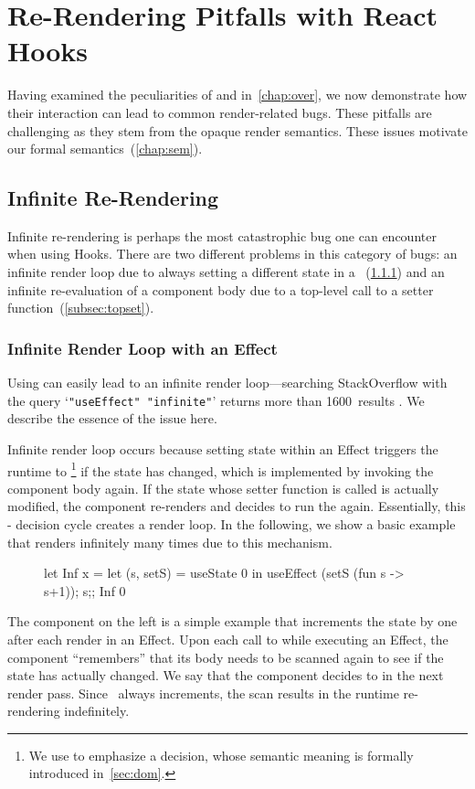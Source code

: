 \chapter{Re-Rendering Pitfalls with React Hooks}\label{chap:pit}
Having examined the peculiarities of  and  in~\cref{chap:over}, we now demonstrate how their interaction can lead to common render-related bugs.
These pitfalls are challenging as they stem from the opaque render semantics.
These issues motivate our formal semantics~(\cref{chap:sem}).


\section{Infinite Re-Rendering}\label{sec:inf}
Infinite re-rendering is perhaps the most catastrophic bug one can encounter when using Hooks.
There are two different problems in this category of bugs: an infinite render loop due to always setting a different state in a ~(\cref{subsec:infloop}) and an infinite re-evaluation of a component body due to a top-level call to a setter function~(\cref{subsec:topset}).


\subsection{Infinite Render Loop with an Effect}\label{subsec:infloop}
Using  can easily lead to an infinite render loop---searching StackOverflow with the query `\texttt{"useEffect" "infinite"}' returns more than 1600~results \citep{Jay25Archive}.
We describe the essence of the issue here.

Infinite render loop occurs because setting state within an Effect triggers the runtime to \footnote{We use  to emphasize a decision, whose semantic meaning is formally introduced in~\cref{sec:dom}.} if the state has changed, which is implemented by invoking the component body again.
If the state whose setter function is called is actually modified, the component re-renders and decides to run the  again.
Essentially, this - decision cycle creates a render loop.
In the following, we show a basic example that renders infinitely many times due to this mechanism.

\begin{figure}
  \vspace{-1.5\intextsep}
  \begin{reactcode}
let Inf x =
  let (s, setS) = useState 0 in
  useEffect (setS (fun s -> s+1));
  s;;
Inf 0
  \end{reactcode}
\end{figure}
\noindent The component  on the left is a simple example that increments the state by one after each render in an Effect.
Upon each call to  while executing an Effect, the component ``remembers'' that its body needs to be scanned again to see if the state has actually changed.
We say that the component decides to  in the next render pass.
Since~ always increments, the scan results in the runtime re-rendering  indefinitely.


